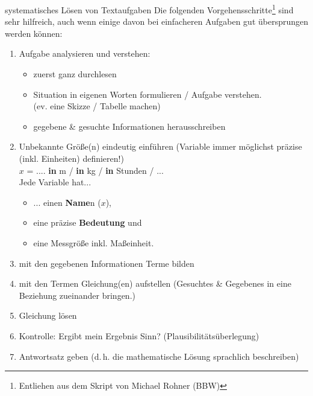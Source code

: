 \begin{rezept}{systematisches Lösen von Textaufgaben}{}
Die folgenden Vorgehensschritte\footnote{Entliehen aus dem Skript von Michael
  Rohner (BBW)} sind sehr hilfreich, auch wenn einige davon bei
  einfacheren Aufgaben gut übersprungen werden können:

\begin{enumerate}\label{textaufgaben_verfahren_in_sieben_schritten}
\item Aufgabe analysieren und verstehen:
  \begin{itemize}
  \item zuerst ganz durchlesen
  \item Situation in eigenen Worten formulieren / Aufgabe verstehen.\\
    (ev. eine Skizze / Tabelle machen)
  \item gegebene \& gesuchte Informationen herausschreiben
  \end {itemize}
  
\item Unbekannte Größe(n) eindeutig einführen
  (Variable immer möglichst präzise (inkl. Einheiten) definieren!)
  \\
  $x$ = .... \textbf{in} m / \textbf{in} kg / \textbf{in} Stunden  /
  ...
  \\
  Jede Variable hat...
  \begin{itemize}
  \item ... einen \textbf{Name}n (\zB $x$),
  \item eine präzise \textbf{Bedeutung} und
  \item eine Messgröße inkl. Maßeinheit.
  \end{itemize}
  
\item mit den gegebenen Informationen Terme bilden
  
\item mit den Termen Gleichung(en) aufstellen
  (Gesuchtes \& Gegebenes in eine Beziehung zueinander bringen.)

\item Gleichung lösen

\item Kontrolle: Ergibt mein Ergebnis Sinn? (Plausibilitätsüberlegung)

\item  Antwortsatz geben (d.\,h. die mathematische Lösung sprachlich
    beschreiben)
    
\end{enumerate}    
\end{rezept}

